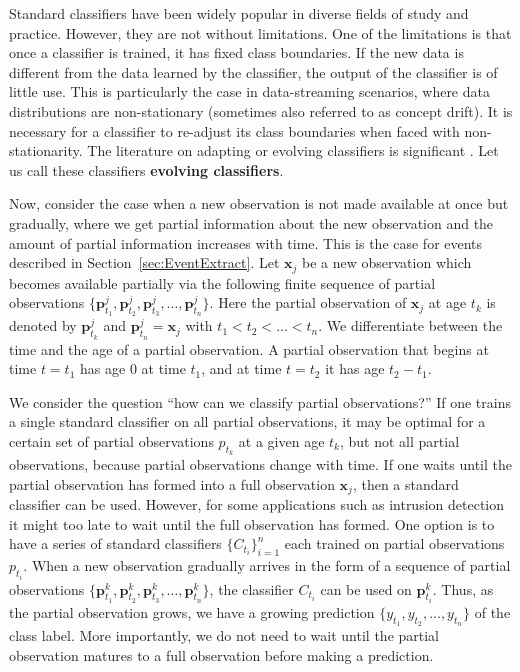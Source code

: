 \documentclass[a4paper,11pt]{article}
\begin{document}
Standard classifiers have been widely popular in diverse fields of study and practice. However, they are not without limitations. One of the limitations is that once a classifier is trained, it has fixed class boundaries. If the new data is different from the data learned by the classifier, the output of the classifier is of little use. This is particularly the case in data-streaming scenarios, where data distributions are non-stationary (sometimes also referred to as concept drift). It is necessary for a classifier to re-adjust its class boundaries when faced with non-stationarity. The literature on adapting or evolving classifiers is significant \cite{duchi2011adaptive, dabbagh2005online, frey1991letter, giacinto1997adaptive, nishida2005ace,alippi2008just, alippi2008just2}. Let us call these classifiers \textbf{evolving classifiers}.

Now, consider the case when a new observation is not made available at once but gradually, where we get partial information about the new observation and the amount of partial information increases with time. This is the case for events described in Section~\ref{sec:EventExtract}. Let $\bm{x}_j$ be a new observation which becomes available partially via the following finite sequence of partial observations $\{\bm{p}^j_{t_1},\bm{p}^j_{t_2}, \bm{p}^j_{t_3}, \dots, \bm{p}^j_{t_n}\}$. Here the partial observation of $\bm{x}_j$ at age $t_k$ is denoted by $\bm{p}^j_{t_k}$ and $\bm{p}^j_{t_n} = \bm{x}_j$ with $t_1 < t_2 < \dots < t_n$. We differentiate between the time and the age of a partial observation. A partial observation that begins at time $t =t_1$ has age $0$ at time $t_1$, and at time $t = t_2$ it has age $t_2 - t_1$.

We consider the question ``how can we classify partial observations?'' If one trains a single standard classifier on all partial observations, it may be optimal for a certain set of partial observations $p_{t_k}$ at a given age $t_k$, but not all partial observations, because partial observations change with time. If one waits until the partial observation has formed into a full observation $\bm{x}_j$, then a standard classifier can be used. However, for some applications such as intrusion detection it might too late to wait until the full observation has formed. One option is to have a series of standard classifiers $\{C_{t_i}\}_{i=1}^n$ each trained on partial observations $p_{t_i}$. When a new observation gradually arrives in the form of a sequence of partial observations $\{\bm{p}^k_{t_1},\bm{p}^k_{t_2}, \bm{p}^k_{t_3}, \dots, \bm{p}^k_{t_n}\}$, the classifier $C_{t_i}$ can be used on $\bm{p}^k_{t_i}$. Thus, as the partial observation grows, we have a growing prediction $\{y_{t_1}, y_{t_2}, \dots, y_{t_n}\}$ of the class label. More importantly, we do not need to wait until the partial observation matures to a full observation before making a prediction. 
\end{document}
